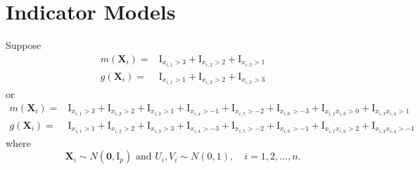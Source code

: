 \documentclass[en,12pt,mtpro2]{elegantpaper}
\begin{document}
\section{Indicator Models}

Suppose
\begin{equation}
    \begin{aligned}
        m\left(\mathbf{X}_{i}\right)= & \mathrm{I}_{x_{i,1}>3}+\mathrm{I}_{x_{i,2}>2}+\mathrm{I}_{x_{i,3}>1} \\
        g\left(\mathbf{X}_{i}\right)= & \mathrm{I}_{x_{i,1}>1}+\mathrm{I}_{x_{i,2}>2}+\mathrm{I}_{x_{i,3}>3}
    \end{aligned}
    \label{eq:indicator-model-1}
\end{equation}
or
\begin{equation}
    \begin{aligned}
        m\left(\mathbf{X}_{i}\right)= & \mathrm{I}_{x_{i,1}>3}+\mathrm{I}_{x_{i,2}>2}+\mathrm{I}_{x_{i,3}>1}+\mathrm{I}_{x_{i,4}>-1}+\mathrm{I}_{x_{i,5}>-2}+\mathrm{I}_{x_{i,6}>-3}+\mathrm{I}_{x_{i,1}x_{i,6}>0}+\mathrm{I}_{x_{i,3}x_{i,4}>1} \\
        g\left(\mathbf{X}_{i}\right)= & \mathrm{I}_{x_{i,1}>1}+\mathrm{I}_{x_{i,2}>2}+\mathrm{I}_{x_{i,3}>3}+\mathrm{I}_{x_{i,4}>-3}+\mathrm{I}_{x_{i,5}>-2}+\mathrm{I}_{x_{i,6}>-1}+\mathrm{I}_{x_{i,1}x_{i,6}>2}+\mathrm{I}_{x_{i,3}x_{i,4}>-1}
        \label{eq:indicator-model-2}
    \end{aligned}
\end{equation}
where
\begin{equation*}
    \mathbf{X}_{i}\sim N\left(\boldsymbol{0},\mathrm{I}_{p}\right)\text{ and }U_{i},V_{i}\sim N\left(0,1\right),\quad i=1,2,\ldots,n.
\end{equation*}
\end{document}
